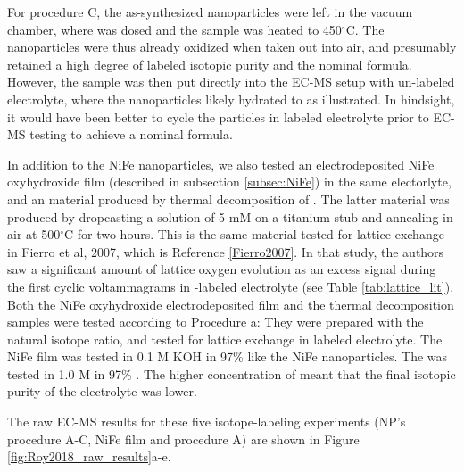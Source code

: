 For procedure C, the as-synthesized nanoparticles were left in the vacuum chamber, where  was dosed and the sample was heated to 450$^\circ$C. The nanoparticles were thus already oxidized when taken out into air, and presumably retained a high degree of labeled isotopic purity and the nominal  formula. However, the sample was then put directly into the EC-MS setup with un-labeled electrolyte, where the nanoparticles likely hydrated to  as illustrated. In hindsight, it would have been better to cycle the particles in labeled electrolyte prior to EC-MS testing to achieve a nominal  formula.

In addition to the NiFe nanoparticles, we also tested an electrodeposited NiFe oxyhydroxide film (described in subsection \ref{subsec:NiFe}) in the same electorlyte, and an  material produced by thermal decomposition of . The latter material was produced by dropcasting a solution of 5 mM  on a titanium stub and annealing in air at 500$^\circ$C for two hours. This is the same material tested for lattice exchange in Fierro et al, 2007, which is Reference \ref{Fierro2007}. In that study, the authors saw a significant amount of lattice oxygen evolution as an excess  signal during the first cyclic voltammagrams in -labeled electrolyte (see Table \ref{tab:lattice_lit}). Both the NiFe oxyhydroxide electrodeposited film and the thermal decomposition  samples were tested according to Procedure a: They were prepared with the natural isotope ratio, and tested for lattice exchange in labeled electrolyte. The NiFe film was tested in 0.1 M KOH in 97\%  like the NiFe nanoparticles. The  was tested in 1.0 M  in 97\% . The higher concentration of  meant that the final isotopic purity of the electrolyte was lower.

The raw EC-MS results for these five isotope-labeling experiments (NP's procedure A-C, NiFe film and  procedure A) are shown in Figure \ref{fig:Roy2018_raw_results}a-e. 

